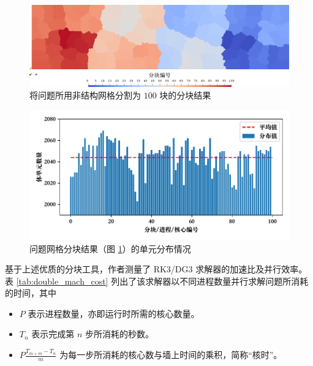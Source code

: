 \begin{figure}[h!]
\begin{centering}
\includegraphics[width=1\textwidth,height=0.4\textheight,keepaspectratio]{figures/double_mach/partition}
\par\end{centering}
\caption{\label{fig:double_mach_partition}将问题所用非结构网格分割为
$100$ 块的分块结果}
\end{figure}

\begin{figure}[h!]
\begin{centering}
\includegraphics[width=1\textwidth,height=0.3\textheight,keepaspectratio]{figures/double_mach/balance}
\par\end{centering}
\caption{\label{fig:double_mach_balance}问题网格分块结果（图
\ref{fig:double_mach_partition}）的单元分布情况}
\end{figure}

基于上述优质的分块工具，作者测量了 RK3/DG3 求解器的加速比及并行效率。表 \ref{tab:double_mach_cost}
列出了该求解器以不同进程数量并行求解问题所消耗的时间，其中
\begin{itemize}
\item $P$ 表示进程数量，亦即运行时所需的核心数量。
\item $T_{n}$ 表示完成第 $n$ 步所消耗的秒数。
\item $P\frac{T_{m+m}-T_{n}}{m}$ 为每一步所消耗的核心数与墙上时间的乘积，简称“核时”。
\end{itemize}

